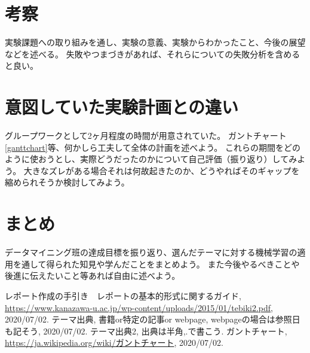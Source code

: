 \documentclass[a4paper, 11pt, titlepage]{jsarticle}
\begin{document}
\section{考察}
実験課題への取り組みを通し、実験の意義、実験からわかったこと、今後の展望などを述べる。
失敗やつまづきがあれば、それらについての失敗分析を含めると良い。

\section{意図していた実験計画との違い}
グループワークとして2ヶ月程度の時間が用意されていた。
ガントチャート\ref{ganttchart}等、何かしら工夫して全体の計画を述べよう。
これらの期間をどのように使おうとし、実際どうだったのかについて自己評価（振り返り）してみよう。
大きなズレがある場合それは何故起きたのか、どうやればそのギャップを縮められそうか検討してみよう。

\section{まとめ}
データマイニング班の達成目標を振り返り、選んだテーマに対する機械学習の適用を通して得られた知見や学んだことをまとめよう。
また今後やるべきことや後進に伝えたいこと等あれば自由に述べよう。

\begin{thebibliography}{n}
  レポート作成の手引き　レポートの基本的形式に関するガイド, \url{https://www.kanazawa-u.ac.jp/wp-content/uploads/2015/01/tebiki2.pdf}, 2020/07/02.
	テーマ出典, 書籍or特定の記事or webpage, webpageの場合は参照日も記そう, 2020/07/02.
	テーマ出典2, 出典は半角,.で書こう.
	ガントチャート, \url{https://ja.wikipedia.org/wiki/ガントチャート}, 2020/07/02.
\end{thebibliography}
\end{document}
